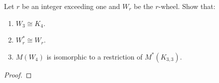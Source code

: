 \prob
{\label{p11}
    Let $r$ be an integer exceeding one and $W_r$ be the $r$-wheel. Show that:
    \begin{enumerate}[label=(\roman*)]
        \item $W_3 \cong K_4$.
        \item $W_r^* \cong W_r$.
        \item $M(W_4)$ is isomorphic to a restriction of $M^*(K_{3,3})$.
    \end{enumerate}
}
\begin{proof}
\end{proof}